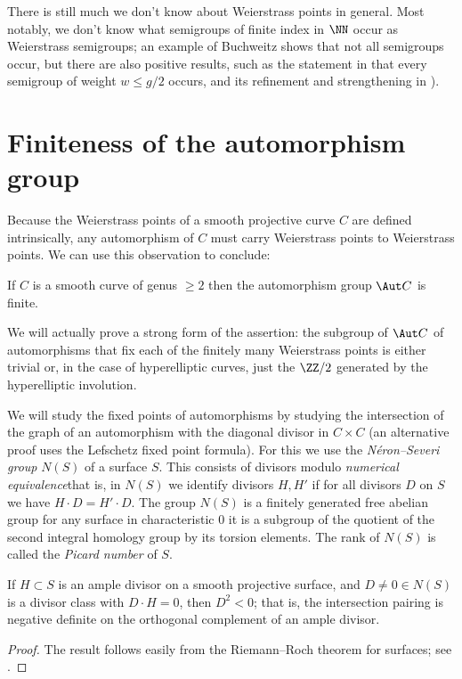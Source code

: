 There is still much we don't know about Weierstrass points in
general. Most notably, we don't know what semigroups of finite index in
$\NN$ occur as Weierstrass semigroups; an example of Buchweitz shows
%
that not all semigroups occur, but there are also positive results,
such as the statement in
\cite{EHWeierstrass}
that every semigroup of weight $w \leq g/2$
%
occurs, and its refinement and strengthening in \cite{MR3892968}).


\section{Finiteness of the automorphism group}\label{finiteness section}

Because the Weierstrass points of a smooth projective curve $C$ are
%
defined intrinsically, any automorphism of $C$ must carry Weierstrass
points to Weierstrass points. We can use this observation to 
conclude:

\begin{theorem}\label{finite autos}
If $C$ is a smooth curve of genus $\geq 2$ then the automorphism group
$\Aut C$ is finite.
\end{theorem}

We will actually prove a strong form of the assertion: the subgroup of
$\Aut C$ of automorphisms that fix each  of the finitely many Weierstrass
points is either
 trivial or, in the case of hyperelliptic curves, just the $\ZZ/2$
 generated by the hyperelliptic involution.

We will study the fixed points of automorphisms by studying the
intersection of the graph of
an automorphism with the diagonal divisor in $C\times C$ (an alternative
proof uses the Lefschetz fixed point formula). For this we use the
%
%
\emph{N\'eron--Severi group} $N(S)$ of a surface $S$. This consists of
divisors modulo \emph{numerical equivalence}\emdash that is, in $N(S)$ we
%
identify divisors $H, H'$ if for all divisors $D$ on $S$ we have $H\cdot
D = H'\cdot D$. The group
$N(S)$ is a  finitely generated free abelian group for any surface\emdash
in characteristic 0 it is a subgroup of the quotient of the second
integral homology group by its torsion elements. The rank of $N(S)$
is called the \emph{Picard number} of $S$.

\begin{theorem}\label{hodge index}
If $H\subset S$ is an ample divisor on a smooth projective surface,
%
and $D \neq 0 \in N(S)$ is a divisor class with $D\cdot H = 0$, then
$D^2<0$; that is, the intersection pairing is negative definite on the
orthogonal complement of an
ample divisor.
\end{theorem}
\begin{proof}
The result follows easily from the Riemann--Roch theorem for surfaces;
see \cite[Theorem V.1.9]{Hartshorne1977}.
\end{proof}

